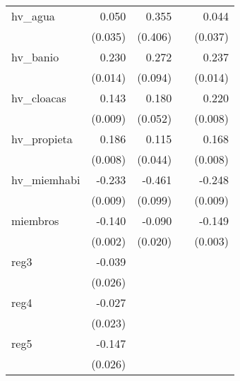 {\begin{longtable}{l*{4}{D{.}{.}{-1}}}
\addlinespace
hv\_agua     &       0.050         &       0.355         &                     &       0.044         \\
            &     (0.035)         &     (0.406)         &                     &     (0.037)         \\
\addlinespace
hv\_banio    &       0.230\sym{***}&       0.272\sym{**} &                     &       0.237\sym{***}\\
            &     (0.014)         &     (0.094)         &                     &     (0.014)         \\
\addlinespace
hv\_cloacas  &       0.143\sym{***}&       0.180\sym{***}&                     &       0.220\sym{***}\\
            &     (0.009)         &     (0.052)         &                     &     (0.008)         \\
\addlinespace
hv\_propieta &       0.186\sym{***}&       0.115\sym{**} &                     &       0.168\sym{***}\\
            &     (0.008)         &     (0.044)         &                     &     (0.008)         \\
\addlinespace
hv\_miemhabi &      -0.233\sym{***}&      -0.461\sym{***}&                     &      -0.248\sym{***}\\
            &     (0.009)         &     (0.099)         &                     &     (0.009)         \\
\addlinespace
miembros    &      -0.140\sym{***}&      -0.090\sym{***}&                     &      -0.149\sym{***}\\
            &     (0.002)         &     (0.020)         &                     &     (0.003)         \\
\addlinespace
reg3        &      -0.039         &                     &                     &                     \\
            &     (0.026)         &                     &                     &                     \\
\addlinespace
reg4        &      -0.027         &                     &                     &                     \\
            &     (0.023)         &                     &                     &                     \\
\addlinespace
reg5        &      -0.147\sym{***}&                     &                     &                     \\
            &     (0.026)         &                     &                     &                     \\

\end{longtable}}
